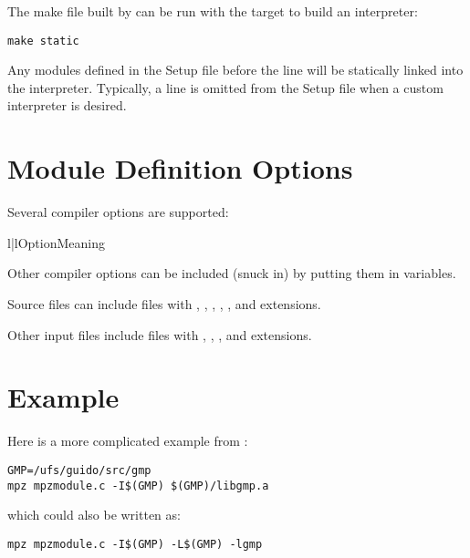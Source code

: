 \documentclass{manual}
\begin{document}
The make file built by  can be run with the
 target to build an interpreter:

\begin{verbatim}
make static
\end{verbatim}

Any modules defined in the Setup file before the  line
will be statically linked into the interpreter.  Typically, a
 line is omitted from the Setup file when a custom
interpreter is desired.


\section{Module Definition Options \label{module-defn-options}}

Several compiler options are supported:

\begin{tableii}{l|l}{}{Option}{Meaning}
\end{tableii}

Other compiler options can be included (snuck in) by putting them
in variables.

Source files can include files with , , ,
, , and  extensions. 

Other input files include files with , , , 
and  extensions.


\section{Example \label{module-defn-example}}

Here is a more complicated example from :

\begin{verbatim}
GMP=/ufs/guido/src/gmp
mpz mpzmodule.c -I$(GMP) $(GMP)/libgmp.a
\end{verbatim}

which could also be written as:

\begin{verbatim}
mpz mpzmodule.c -I$(GMP) -L$(GMP) -lgmp
\end{verbatim}
\end{document}
